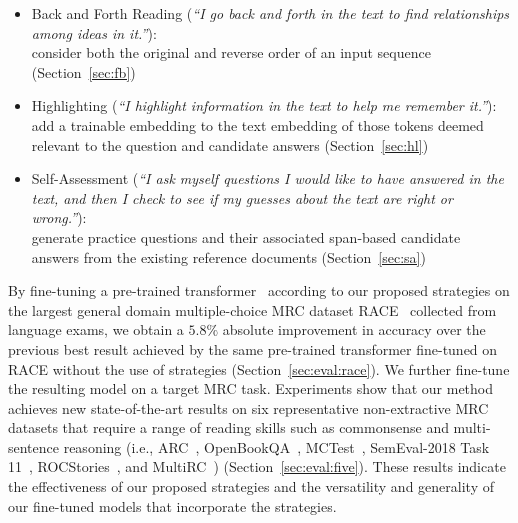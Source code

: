 \documentclass[11pt,a4paper]{article}
\newcommand{\ie}{{i.e.}}
\begin{document}
\vspace{-\topsep}
\begin{itemize}
\setlength\itemsep{-0.25em}
    \item {\sc Back and Forth Reading} (\emph{``I go back and forth in the text to find relationships among ideas in it.''}):\\
    consider both the original and reverse order of an input sequence (Section~\ref{sec:fb})
    
    \item {\sc Highlighting} (\emph{``I highlight information in the text to help me remember it.''}):\\
    add a trainable embedding to the text embedding of those tokens deemed relevant to the question and candidate answers (Section~\ref{sec:hl})
    
    \item {\sc Self-Assessment} (\emph{``I ask myself questions I would like to have answered in the text, and then I check to see if my guesses about the text are right or wrong.''}):\\
    generate practice questions and their associated span-based candidate answers from the existing reference documents (Section~\ref{sec:sa})
\end{itemize}
\vspace{-\topsep}


By fine-tuning a pre-trained transformer~\cite{radfordimproving} according to our proposed strategies on the largest general domain multiple-choice MRC dataset RACE~\cite{lai2017race} collected from language exams, we obtain a $5.8\%$ absolute improvement in accuracy over the previous best result achieved by the same pre-trained transformer fine-tuned on RACE without the use of strategies (Section~\ref{sec:eval:race}). We further fine-tune the resulting model on a target MRC task. Experiments show that our method achieves new state-of-the-art results on six representative non-extractive MRC datasets that require a range of reading skills such as commonsense and multi-sentence reasoning (\ie, ARC~\cite{clark2016combining,clark2018think}, OpenBookQA~\cite{mihaylov2018can}, MCTest~\cite{richardson2013mctest}, SemEval-2018 Task 11~\cite{yang2017semi}, ROCStories~\cite{mostafazadeh2016corpus}, and MultiRC~\cite{khashabi2018looking}) (Section~\ref{sec:eval:five}). These results indicate the effectiveness of our proposed strategies and the versatility and generality of our fine-tuned models that incorporate the strategies.
\end{document}
